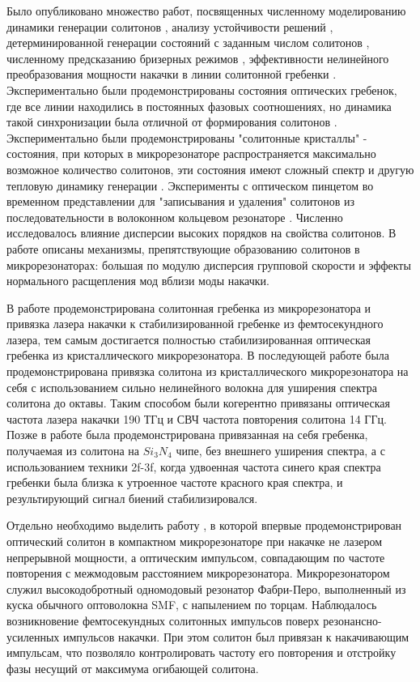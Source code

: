 Было опубликовано множество работ, посвященных численному моделированию динамики генерации солитонов \cite{Lamont2013,Hansson2016}, анализу устойчивости решений \cite{Godey2014}, детерминированной генерации состояний с заданным числом солитонов \cite{Jaramillo2015}, численному предсказанию бризерных режимов \cite{Matsko2012}, эффективности нелинейного преобразования мощности накачки в линии солитонной гребенки \cite{Bao2014}. Экспериментально были продемонстрированы состояния оптических гребенок, где все линии находились в постоянных фазовых соотношениях, но динамика такой синхронизации была отличной от формирования солитонов \cite{Saha2013,DelHaye2014}. Экспериментально были продемонстрированы "солитонные кристаллы" - состояния, при которых в микрорезонаторе распространяется максимально возможное количество солитонов, эти состояния имеют сложный спектр и другую тепловую динамику генерации \cite{Cole2017crystals}. Эксперименты с оптическом пинцетом во временном представлении для "записывания и удаления" солитонов из последовательности в волоконном кольцевом резонаторе \cite{Jang2015}. Численно исследовалось влияние дисперсии высоких порядков \cite{Wang2014} на свойства солитонов. В работе \cite{HerrPRL2014} описаны механизмы, препятствующие образованию солитонов в микрорезонаторах: большая по модулю дисперсия групповой скорости и эффекты нормального расщепления мод вблизи моды накачки.

В работе \cite{Jost2015} продемонстрирована солитонная гребенка из микрорезонатора и привязка лазера накачки к стабилизированной гребенке из фемтосекундного лазера, тем самым достигается полностью стабилизированная оптическая гребенка из кристаллического микрорезонатора. В последующей работе \cite{Jost:15} была продемонстрирована привязка солитона из кристаллического микрорезонатора на себя с использованием сильно нелинейного волокна для уширения спектра солитона до октавы. Таким способом были когерентно привязаны оптическая частота лазера накачки 190 ТГц и СВЧ частота повторения солитона 14 ГГц. Позже в работе \cite{Brasch2017} была продемонстрирована привязанная на себя гребенка, получаемая из солитона на $Si_3N_4$ чипе, без внешнего уширения спектра, а с использованием техники 2f-3f, когда удвоенная частота синего края спектра гребенки была близка к утроенное частоте красного края спектра, и результирующий сигнал биений стабилизировался.

Отдельно необходимо выделить работу \cite{Obrzud2017}, в которой впервые продемонстрирован оптический солитон в компактном микрорезонаторе при накачке не лазером непрерывной мощности, а оптическим импульсом, совпадающим по частоте повторения с межмодовым расстоянием микрорезонатора. Микрорезонатором служил высокодобротный одномодовый резонатор Фабри-Перо, выполненный из куска обычного оптоволокна SMF, с напылением по торцам. Наблюдалось возникновение фемтосекундных солитонных импульсов поверх резонансно-усиленных импульсов накачки. При этом солитон был привязан к накачивающим импульсам, что позволяло контролировать частоту его повторения и отстройку фазы несущий от максимума огибающей солитона.

